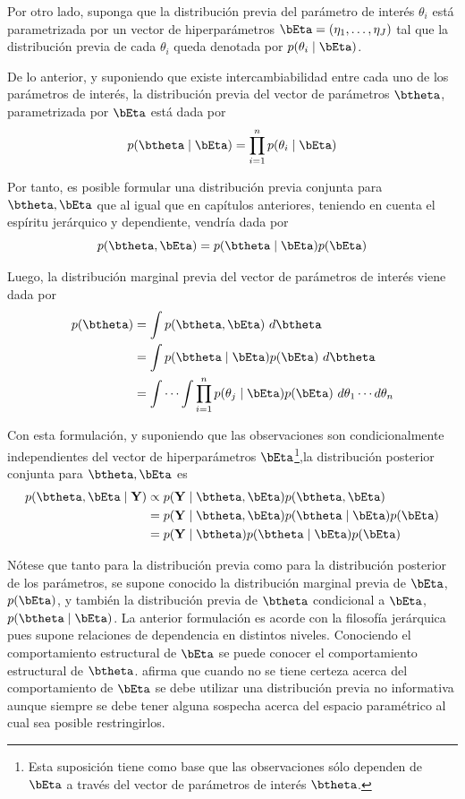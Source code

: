 Por otro lado, suponga que la distribución previa del parámetro de interés $\theta_i$ está parametrizada por un vector de hiperparámetros $\bEta=(\eta_1,\ldots,\eta_J)$ tal que la distribución previa de cada $\theta_i$ queda denotada por $p(\theta_i \mid \bEta)$.

De lo anterior, y suponiendo que existe intercambiabilidad entre cada uno de los parámetros de interés, la distribución previa del vector de parámetros $\btheta$, parametrizada por $\bEta$ está dada por
\begin{equation}
p(\btheta \mid \bEta)=\prod_{i=1}^n p(\theta_i \mid \bEta)
\end{equation}

Por tanto, es posible formular una distribución previa conjunta para $\btheta,\bEta$ que al igual que en capítulos anteriores, teniendo en cuenta el espíritu jerárquico y dependiente, vendría dada por
\begin{equation}
p(\btheta,\bEta)=p(\btheta \mid \bEta)p(\bEta)
\end{equation}

Luego, la distribución marginal previa del vector de parámetros de interés viene dada por
\begin{align*}
p(\btheta)&=\int p(\btheta,\bEta) \ d\btheta\\
&=\int p(\btheta \mid \bEta)p(\bEta) \ d\btheta\\
&=\int \cdots \int \prod_{i=1}^n p(\theta_j \mid \bEta)p(\bEta) \ d\theta_1\cdots d\theta_n
\end{align*}

Con esta formulación, y suponiendo que las observaciones son condicionalmente independientes del vector de hiperparámetros $\bEta$\footnote{Esta suposición tiene como base que las observaciones sólo dependen de $\bEta$ a través del vector de parámetros de interés $\btheta$.},la distribución posterior conjunta para $\btheta,\bEta$ es
\begin{align}\label{pos_theta_eta}
p(\btheta, \bEta \mid \mathbf{Y}) &\propto p(\mathbf{Y} \mid \btheta, \bEta)p(\btheta,\bEta)  \notag \\
&= p(\mathbf{Y} \mid \btheta, \bEta) p(\btheta \mid \bEta) p(\bEta)  \notag \\
&= p(\mathbf{Y} \mid \btheta) p(\btheta \mid \bEta) p(\bEta)
\end{align}

Nótese que tanto para la distribución previa como para la distribución posterior de los parámetros, se supone conocido la distribución marginal previa de $\bEta$, $p(\bEta)$, y también la distribución previa de $\btheta$ condicional a $\bEta$, $p(\btheta\mid\bEta)$. La anterior formulación es acorde con la filosofía jerárquica pues supone relaciones de dependencia en distintos niveles. Conociendo el comportamiento estructural de $\bEta$ se puede conocer el comportamiento estructural de $\btheta$.  afirma que cuando no se tiene certeza acerca del comportamiento de $\bEta$ se debe utilizar una distribución previa no informativa aunque siempre se debe tener alguna sospecha acerca del espacio paramétrico al cual sea posible restringirlos.

